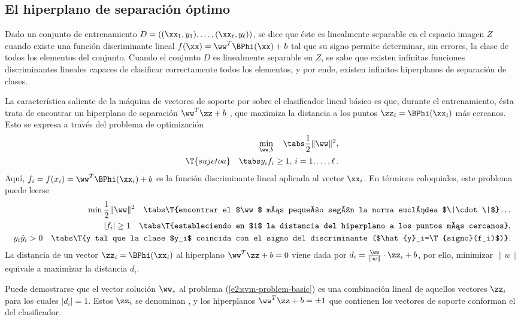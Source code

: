 %
%
\subsection{El hiperplano de separación óptimo}
%
Dado un conjunto de entrenamiento
$D=\left((\xx_1,y_1),\ldots,(\xx_\ell,y_\ell)\right)$, se dice que
éste es linealmente separable en el espacio imagen $Z$ cuando existe
una función discriminante lineal $f(\xx)=\ww^T\BPhi(\xx)+b$ tal que su
signo permite determinar, sin errores, la clase de todos los elementos
del conjunto.
Cuando el conjunto $D$ es linealmente separable en $Z$, se sabe que
existen infinitas funciones discriminantes lineales capaces de
clasificar correctamente todos los elementos, y por ende, existen
infinitos hiperplanos de separación de clases.

La característica saliente de la máquina de vectores de soporte por
sobre el clasificador lineal básico es que, durante el entrenamiento,
ésta trata de encontrar un hiperplano de separación $\ww^T\zz+b$
, que maximiza la distancia a los puntos
$\zz_i=\BPhi(\xx_i)$ más cercanos. Esto se expresa a través del
problema de optimización
%
\begin{align}\label{e2:svm-problem-basic}
  \begin{split}
    \min_{\ww,b} \quad\tabs \frac{1}{2}\|\ww\|^2, \\
    \T{sujeto a}\quad\tabs y_i f_i\geq1,\,i=1,\ldots,\ell\,.
  \end{split}
\end{align}
%
Aquí, $f_i=f(x_i)=\ww^T\BPhi(\xx_i)+b$ es la función discriminante
lineal aplicada al vector $\xx_i$. En términos coloquiales, este
problema puede leerse
%
\begin{align*}
  \begin{split}
    \min \frac{1}{2}\|\ww\|^2 \quad \tabs \T{encontrar el $\ww$ más
      pequeño según la norma euclídea $\|\cdot\|$}\ldots\\
    |f_i|\geq1 \quad \tabs \T{estableciendo en $1$ la distancia del
      hiperplano a los puntos más cercanos},\\
    y_i\hat{y}_i>0\quad \tabs \T{y tal que la clase $y_i$ coincida con el
      signo del discriminante ($\hat{y}_i=\T{signo}(f_i)$)}.
  \end{split}
\end{align*}
%
La distancia de un vector $\zz_i=\BPhi(\xx_i)$ al hiperplano
$\ww^T\zz+b=0$ viene dada por $d_i=\frac{\ww}{\|w\|}\cdot\zz_i+b$, por
ello, minimizar $\|w\|$ equivale a maximizar la distancia $d_i$.

Puede demostrarse que el vector solución $\ww_*$ al problema
(\ref{e2:svm-problem-basic}) es una combinación lineal de aquellos
vectores $\zz_i$ para los cuales $|d_i|=1$. Estos $\zz_i$ se denominan
, y los hiperplanos $\ww^T\zz+b=\pm1$ que
contienen los vectores de soporte conforman el  del
clasificador.

